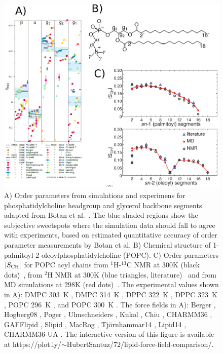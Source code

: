 \documentclass[aps,prl,superscriptaddress,twocolumn]{revtex4}
\begin{document}
\begin{figure}[]
  \includegraphics[width=17.2cm]{../Fig/allOPs.eps}
  \caption{\label{allOPs}
    A)  Order parameters from simulations and experimens for phosphatidylcholine headgroup and glycerol 
    backbone segments adapted from Botan et al.~\cite{botan15}. The blue shaded regions show the
    subjective sweetspots where the simulation data should fall to agree with experiments, 
    based on estimated quantitative accuracy of order parameter measurements by Botan et al.
    B) Chemical structure of 1-palmitoyl-2-oleoylphosphatidylcholine (POPC).
    C) Order parameters $|S_{{\rm CH}}|$ for POPC acyl chains 
    from $^1$H-$^{13}$C NMR at 300K (black dots)~\cite{ferreira13},
    from $^2$H NMR at 300K (blue triangles, literature)~\cite{seelig78,perly85} and 
    from MD simulations at 298K (red dots)~\cite{ferreira13}.
    The experimental values shown in A):
    DMPC 303~K \cite{gross97},
    DMPC 314~K \cite{dvinskikh05a},
    DPPC 322~K \cite{gally75},
    DPPC 323~K \cite{akutsu81},
    POPC 296~K \cite{bechinger91}, and
    POPC 300~K \cite{ferreira13}.
    The force fields in A):
    Berger \cite{berger97},
    Hogberg08 \cite{hogberg08},
    Poger \cite{poger10},
    Ulmschneiders \cite{ulmschneider09},
    Kukol \cite{kukol09},
    Chiu \cite{chiu09},
    CHARMM36 \cite{klauda10},
    GAFFlipid \cite{dickson12},
    Slipid \cite{jambeck12},
    MacRog \cite{maciejewski14},
    Tj{\"o}rnhammar14 \cite{tjornhammar14},
    Lipid14 \cite{dickson14},
    CHARMM36-UA \cite{lee14}. 
    The interactive version of this figure is available at  https://plot.ly/$\sim$HubertSantuz/72/lipid-force-field-comparison/.   
  }
\end{figure}
\end{document}
